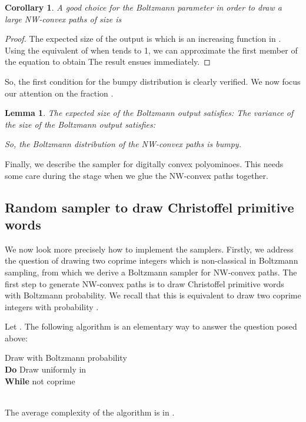 \documentclass{article}
\newtheorem{lemma}[theorem]{Lemma}
\newtheorem{corollary}[theorem]{Corollary}
\begin{document}
\begin{corollary}
\label{corgoodchoice}
A good choice for the Boltzmann parameter  in
order to draw a large NW-convex paths of size  is


\end{corollary}
\begin{proof}
The expected size of the output is  which is an increasing function in . Using the equivalent of  when  tends to 1, we can approximate the first member of the equation  to obtain  The result ensues immediately.
\end{proof}

So, the first
condition for the bumpy distribution is clearly verified. We now
focus our attention on the fraction .

\begin{lemma} \label{lem:bumpy}
The expected size of the Boltzmann output satisfies:
 The
variance of the size of the Boltzmann output satisfies:

So, the Boltzmann distribution of the NW-convex paths is bumpy.
\end{lemma}




Finally, we
describe the sampler for digitally convex polyominoes. This needs
some care during the stage when we glue the NW-convex paths together.

\subsection{Random sampler to draw Christoffel primitive words}
We now look more precisely how to implement the samplers.
 Firstly,
we address the question  of drawing two coprime integers which
is non-classical in Boltzmann sampling, from which we derive a Boltzmann sampler for NW-convex paths.
The first step to generate NW-convex paths is to draw Christoffel primitive words with Boltzmann probability.
We recall that this is equivalent to draw two coprime integers  with probability .

Let . The
following algorithm is an elementary way to answer the question
posed above:

\begin{algorithm}[H]
\caption{}
\label{gammaCP}

Draw  with Boltzmann probability \\

\textbf{Do} Draw  uniformly in \\
\textbf{While}  not coprime\\
\Return \\
\end{algorithm}
The average complexity of the algorithm is in . 
\end{document}

